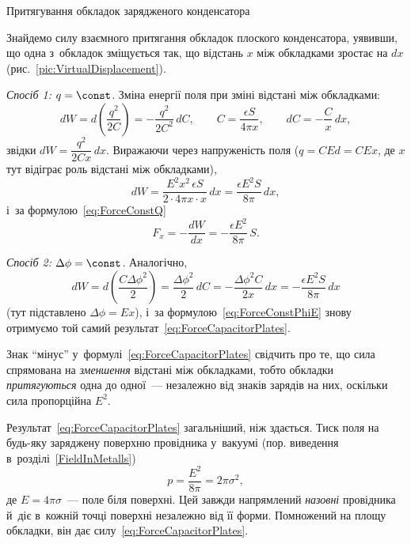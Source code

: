\begin{Example}{Притягування обкладок зарядженого конденсатора}

Знайдемо силу взаємного притягання обкладок плоского конденсатора, уявивши, що одна
з~обкладок зміщується так, що відстань $x$ між обкладками зростає на $dx$
(рис.~\ref{pic:VirtualDisplacement}).

\emph{Спосіб 1: $q = \const$.} Зміна енергії поля при зміні відстані між обкладками:
\begin{equation*}
	dW = d\left(\frac{q^2}{2C}\right) = -\frac{q^2}{2C^2}\, dC, \qquad C = \frac{\epsilon S}{4\pi x}, \qquad dC = -\frac{C}{x}\, dx,
\end{equation*}
звідки $dW = \dfrac{q^2}{2Cx}\, dx$. Виражаючи через напруженість поля ($q = CEd = C E x$,
де $x$ тут відіграє роль відстані між обкладками),
\begin{equation*}
	dW = \frac{E^2 x^2\, \epsilon S}{2 \cdot 4\pi x \cdot x}\, dx = \frac{\epsilon E^2 S}{8\pi}\, dx,
\end{equation*}
і~за формулою~\eqref{eq:ForceConstQ}
\begin{equation}\label{eq:ForceCapacitorPlates}
		F_x = -\frac{dW}{dx} = -\frac{\epsilon E^2}{8\pi}\, S.
\end{equation}

\emph{Спосіб 2: $\Delta\phi = \const$.} Аналогічно,
\begin{equation*}
	dW = d\left(\frac{C\Delta\phi^2}{2}\right) = \frac{\Delta\phi^2}{2}\, dC =
	-\frac{\Delta\phi^2 C}{2x}\, dx = -\frac{\epsilon E^2 S}{8\pi}\, dx
\end{equation*}
(тут підставлено $\Delta\phi = Ex$), і~за формулою~\eqref{eq:ForceConstPhiE} знову
отримуємо той самий результат~\eqref{eq:ForceCapacitorPlates}.

Знак \enquote{мінус} у~формулі~\eqref{eq:ForceCapacitorPlates} свідчить про те, що сила
спрямована на \emph{зменшення} відстані між обкладками, тобто обкладки
\emph{притягуються} одна до одної~--- незалежно від знаків зарядів на них, оскільки сила
пропорційна $E^2$.
\end{Example}

Результат~\eqref{eq:ForceCapacitorPlates} загальніший, ніж здається. Тиск поля на будь-яку
заряджену поверхню провідника у~вакуумі (пор. виведення в~розділі~\ref{FieldInMetalls})
\begin{equation*}
	p = \frac{E^2}{8\pi} = 2\pi\sigma^2,
\end{equation*}
де $E = 4\pi\sigma$~--- поле біля поверхні. Цей  завжди напрямлений \emph{назовні} провідника й~діє
в~кожній точці поверхні незалежно від її форми. Помножений на площу обкладки, він дає
силу~\eqref{eq:ForceCapacitorPlates}.

